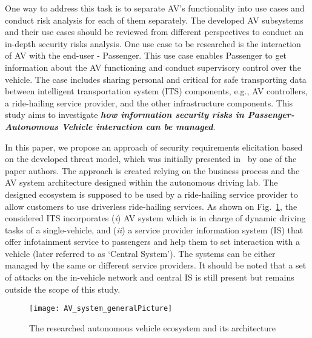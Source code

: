 \documentclass[manuscript]{acmart}
\begin{document}
One way to address this task is to separate AV's functionality into use cases and conduct risk analysis for each of them separately. The developed AV subsystems and their use cases should be reviewed from different perspectives to conduct an in-depth security risks analysis. One use case to be researched is the interaction of AV with the end-user - Passenger. This use case enables Passenger to get information about the AV functioning and conduct supervisory control over the vehicle. The case includes sharing personal and critical for safe transporting data between intelligent transportation system (ITS) components, e.g., AV controllers, a ride-hailing service provider, and the other infrastructure components.
This study aims to investigate \textbf{\textit{how information security risks in Passenger-Autonomous Vehicle interaction can be managed}}.

In this paper, we propose an approach of security requirements elicitation based on the developed threat model, which was initially presented in~\cite{PassengerDataProtection} by one of the paper authors. The approach is created relying on the business process and the AV system architecture designed within the autonomous driving lab. The designed ecosystem is supposed to be used by a ride-hailing service provider to allow customers to use driverless ride-hailing services. As shown on Fig.~\ref{fig:AV_general_model}, the considered ITS incorporates (\textit{i}) AV system which is in charge of dynamic driving tasks of a single-vehicle, and (\textit{ii}) a service provider information system (IS) that offer infotainment service to passengers and help them to set interaction with a vehicle (later referred to as `Central System'). The systems can be either managed by the same or different service providers. It should be noted that a set of attacks on the in-vehicle network and central IS is still present but remains outside the scope of this study.

\begin{figure}[!ht]
    \centering
    \texttt{[image: AV\_system\_generalPicture]}
    \caption{The researched autonomous vehicle ecosystem and its architecture~\cite{PassengerDataProtection}} \label{fig:AV_general_model}
\end{figure}
\end{document}
